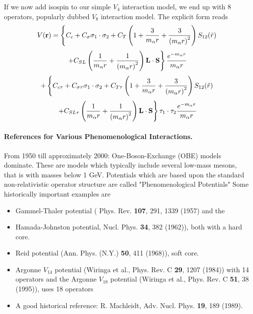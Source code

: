 \documentclass[%
oneside,                 %
final,                   %
10pt]{article}
\begin{document}
\noindent

If we now add isospin to our simple $V_4$ interaction model, we end up with $8$ operators, popularly dubbed $V_8$ interaction model. The explicit form reads
\[
V(\mathbf{r})= \left\{ C_c + C_\mathbf{\sigma} \mathbf{\sigma}_1\cdot\mathbf{\sigma}_2
 + C_T \left( 1 + {3\over m_\alpha r} + {3\over
\left(m_\alpha r\right)^2}\right) S_{12} (\hat r)\right. 
\]
\[
\left. + C_{SL} \left( {1\over m_\alpha r} + {1\over \left( m_\alpha r\right)^2}
\right) \mathbf{L}\cdot \mathbf{S}
\right\} \frac{e^{-m_\alpha r}}{m_\alpha r}
\]
\[
+ \left\{ C_{c\tau} + C_{\sigma\tau}\mathbf{\sigma}_1\cdot\mathbf{\sigma}_2
 + C_{T\tau} \left( 1 + {3\over m_\alpha r} + {3\over
\left(m_\alpha r\right)^2}\right) S_{12} (\hat r)\right. 
\]
\[
\left. + C_{SL\tau} \left( {1\over m_\alpha r} + {1\over \left( m_\alpha r\right)^2}
\right) \mathbf{L}\cdot \mathbf{S}
\right\}\mathbf{\tau}_1\cdot\mathbf{\tau}_2 \frac{e^{-m_\alpha r}}{m_\alpha r}
\]

\paragraph{References for Various Phenomenological Interactions.}
From 1950 till approximately 2000: One-Boson-Exchange (OBE) models dominate. These are models which typically include several low-mass mesons, that is with masses below 1 GeV.   Potentials which are based upon the standard non-relativistic operator structure
 are called "Phenomenological Potentials" Some historically important examples are   
\begin{itemize}
\item Gammel-Thaler potential ( Phys. Rev. \textbf{107}, 291, 1339 (1957) and the 

\item Hamada-Johnston potential, Nucl. Phys. \textbf{34}, 382 (1962)), both with a hard core.

\item Reid potential (Ann. Phys. (N.Y.) \textbf{50}, 411 (1968)), soft core.

\item Argonne $V_{14}$ potential (Wiringa et al., Phys. Rev. C \textbf{29}, 1207 (1984)) with 14 operators and  the  Argonne $V_{18}$ potential (Wiringa et al., Phys. Rev. C \textbf{51}, 38 (1995)), uses 18 operators

\item A good historical reference: R. Machleidt, Adv. Nucl. Phys.  \textbf{19}, 189 (1989).
\end{itemize}
\end{document}
